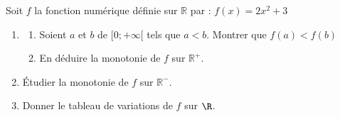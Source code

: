 \begin{Application}[][10 min]
Soit $f$ la fonction numérique définie sur $\mathbb{R}$ par : $f(x) = 2x^2 + 3$
\begin{enumerate}
    \item 
    \begin{enumerate}
        \item Soient $a$ et $b$ de $[0 ; +\infty[$ tels que $a < b$. Montrer que $f(a) < f(b)$
        \item En déduire la monotonie de $f$ sur $\mathbb{R}^+$.
    \end{enumerate}
    \item Étudier la monotonie de $f$ sur $\mathbb{R}^-$.
    \item Donner le tableau de variations de $f$ sur $\R$.
\end{enumerate}
\end{Application}
